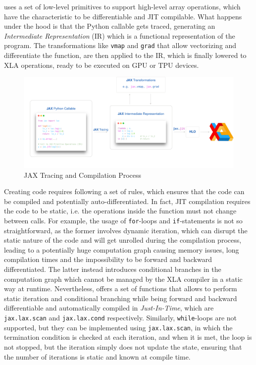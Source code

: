 \jax uses a set of low-level primitives to support high-level array operations, which have the characteristic to be differentiable and \ac{JIT} compilable. What happens under the hood is that the Python callable gets traced, generating an \textit{Intermediate Representation} (\jax IR) which is a functional representation of the program. The \jax transformations like \texttt{vmap} and \texttt{grad} that allow vectorizing and differentiate the function, are then applied to the \jax IR, which is finally lowered to \ac{XLA} operations, ready to be executed on \ac{GPU} or \ac{TPU} devices.


\begin{figure}
    \centering
    \caption{JAX Tracing and Compilation Process}
    \includegraphics[width=\textwidth]{Images/jax_compute_graph_short.png}
\end{figure}

Creating \jax code requires following a set of rules, which ensures that the code can be compiled and potentially auto-differentiated. In fact, \ac{JIT} compilation requires the code to be static, i.e. the operations inside the function must not change between calls.
For example, the usage of \texttt{for}-loops and \texttt{if}-statements is not so straightforward, as the former involves dynamic iteration, which can disrupt the static nature of the code and will get unrolled during the compilation process, leading to a potentially huge computation graph causing memory issues, long compilation times and the impossibility to be forward and backward differentiated. The latter instead introduces conditional branches in the computation graph which cannot be managed by the \ac{XLA} compiler in a static way at runtime. Nevertheless, \jax offers a set of functions that allows to perform static iteration and conditional branching while being forward and backward differentiable and automatically compiled in \textit{Just-In-Time}, which are \texttt{jax.lax.scan} and \texttt{jax.lax.cond} respectively. Similarly, \texttt{while}-loops are not supported, but they can be implemented using \texttt{jax.lax.scan}, in which the termination condition is checked at each iteration, and when it is met, the loop is not stopped, but the iteration simply does not update the state, ensuring that the number of iterations is static and known at compile time.

